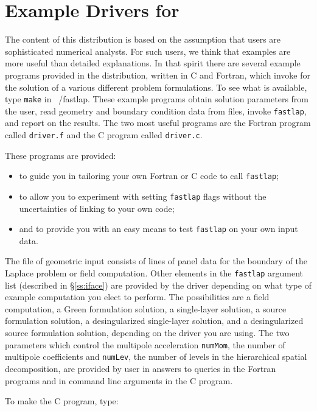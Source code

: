 \section{Example Drivers for \fas}
\label{s:example}

The content of this distribution is based on the assumption that
\fas users are sophisticated numerical analysts.  
For such users, we think that examples are more useful than detailed
explanations.  In that spirit there are several example programs 
provided in the distribution, written in C and Fortran, which invoke 
\fas for the solution of a various different problem formulations.  
To see what is available, type {\tt make} in {~/fastlap}.  These example programs obtain 
solution parameters from the user, read geometry and boundary 
condition data from files, invoke {\tt fastlap}, and report 
on the results.  The two most useful programs are the Fortran program 
called {\tt driver.f} and the C program called {\tt driver.c}.

These programs are provided:
\begin{itemize}
\item{to guide you in tailoring your own Fortran or C code to call {\tt fastlap};}
\item{to allow you to experiment with setting {\tt fastlap} flags without
the uncertainties of linking to your own code;}
\item{and to provide you with an easy means to test {\tt fastlap} on your
own input data.}
\end{itemize}

The file of geometric input consists of lines of panel data for the boundary 
of the Laplace problem or field computation.  Other elements in the 
{\tt fastlap} argument list (described in \S\ref{ss:iface}) 
are provided by the driver depending on what
type of example computation you elect to perform.  The possibilities are a 
field computation, a Green formulation solution, a single-layer solution,
a source formulation solution, a desingularized single-layer solution,
and a desingularized source formulation solution, depending on the driver
you are using.   The two parameters which 
control the multipole acceleration {\tt numMom}, the number of
multipole coefficients and {\tt numLev}, the number of levels in the 
hierarchical spatial decomposition, are provided by user in answers 
to queries in the Fortran programs and in command line arguments in the
C program.

To make the C program, type:

